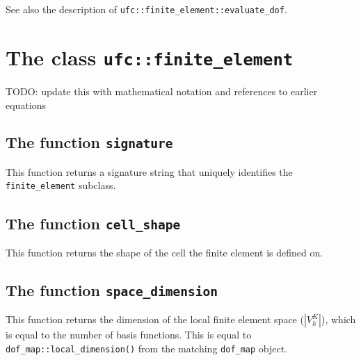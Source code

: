 See also the description of \texttt{ufc::finite\_element::evaluate\_dof}.


\section{The class \texttt{ufc::finite\_element}}

TODO: update this with mathematical notation and references to earlier equations






\subsection{The function \texttt{signature}}
This function returns a signature string that uniquely identifies the \texttt{finite\_element} subclass.


\subsection{The function \texttt{cell\_shape}}
This function returns the shape of the cell the finite element is defined on.


\subsection{The function \texttt{space\_dimension}}
This function returns the dimension of the local finite element space ($| V_h^K |$),
which is equal to the number of basis functions. This is equal to \texttt{dof\_map::local\_dimension()}
from the matching \texttt{dof\_map} object.


